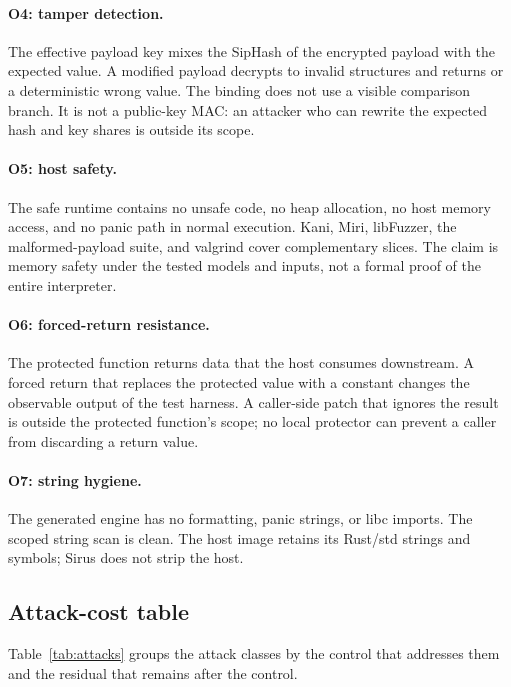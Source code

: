 \paragraph{O4: tamper detection.}
The effective payload key mixes the SipHash of the encrypted payload with the
expected value. A modified payload decrypts to invalid structures and returns
 or a deterministic wrong value. The binding does not use a
visible comparison branch. It is not a public-key MAC: an attacker who can
rewrite the expected hash and key shares is outside its scope.

\paragraph{O5: host safety.}
The safe runtime contains no unsafe code, no heap allocation, no host memory
access, and no panic path in normal execution. Kani, Miri, libFuzzer, the
malformed-payload suite, and valgrind cover complementary slices. The claim is
memory safety under the tested models and inputs, not a formal proof of the
entire interpreter.

\paragraph{O6: forced-return resistance.}
The protected function returns data that the host consumes downstream. A forced
return that replaces the protected value with a constant changes the observable
output of the test harness. A caller-side patch that ignores the result is
outside the protected function's scope; no local protector can prevent a caller
from discarding a return value.

\paragraph{O7: string hygiene.}
The generated engine has no formatting, panic strings, or libc imports. The
scoped  string scan is clean. The host image retains its Rust/std
strings and symbols; Sirus does not strip the host.

\subsection{Attack-cost table}

Table~\ref{tab:attacks} groups the attack classes by the control that addresses
them and the residual that remains after the control.

